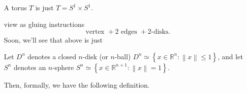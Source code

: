 \begin{eg}
	A torus \(T\) is just \(T = S^1 \times S^1\).
	\begin{center}
	\end{center}
	view as gluing instructions
	\[
		\text{vertex }+ 2 \text{ edges }+2\text{-disks}.
	\]
	Soon, we'll see that above is just
	\begin{center}
	\end{center}
\end{eg}

\begin{notation}
	Let \(D^n\) denotes a closed \(n\)-disk (or \(n\)-ball) \(D^n\simeq \left\{x\in\mathbb{R} ^n\colon \left\lVert x\right\rVert \leq 1\right\}\), and let \(S^n\) denotes an \(n\)-sphere \(S^n\simeq \left\{x\in \mathbb{R}^{n+1}\colon \left\lVert x\right\rVert = 1\right\}\).
\end{notation}

Then, formally, we have the following definition.

